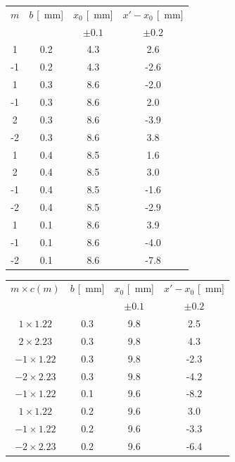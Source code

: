\documentclass[10pt,oneside,a4paper]{article}
\begin{document}
\begin{minipage}[t]{.5\linewidth}
\vspace{0cm}
\begin{center}
\label{tab:misuraLambda1}
\begin{tabular}{c|c|c|c}
$m$ & $b$ [\SI{}{mm}] & $x_0$ [\SI{}{mm}] & $x'-x_0$ [\SI{}{mm}]\\
 & & $\pm 0.1$ & $\pm 0.2$\\
\hline
  1 & 0.2 & 4.3 &  2.6 \\
 -1 & 0.2 & 4.3 & -2.6 \\
  1 & 0.3 & 8.6 & -2.0 \\
 -1 & 0.3 & 8.6 &  2.0 \\
  2 & 0.3 & 8.6 & -3.9 \\
 -2 & 0.3 & 8.6 &  3.8 \\
  1 & 0.4 & 8.5 &  1.6 \\
  2 & 0.4 & 8.5 &  3.0 \\
 -1 & 0.4 & 8.5 & -1.6 \\
 -2 & 0.4 & 8.5 & -2.9 \\
  1 & 0.1 & 8.6 &  3.9 \\
 -1 & 0.1 & 8.6 & -4.0 \\
 -2 & 0.1 & 8.6 & -7.8 \\
\hline
\end{tabular}
\end{center}
\end{minipage}
\quad
\begin{minipage}[t]{.5\linewidth}
\vspace{0cm}
\begin{center}
\label{tab:misuraLambda2}
\begin{tabular}{c|c|c|c}
$m \times c(m)$ & $b$ [\SI{}{mm}] & $x_0$ [\SI{}{mm}] & $x'-x_0$ [\SI{}{mm}]\\
 & & $\pm 0.1$ & $\pm 0.2$\\
\hline
  $1 \times 1.22$ & 0.3 & 9.8 &  2.5 \\
  $2 \times 2.23$ & 0.3 & 9.8 &  4.3 \\
 $-1 \times 1.22$ & 0.3 & 9.8 & -2.3 \\
 $-2 \times 2.23$ & 0.3 & 9.8 & -4.2 \\
 $-1 \times 1.22$ & 0.1 & 9.6 & -8.2 \\
 $1 \times 1.22$ & 0.2 & 9.6 &  3.0 \\
 $-1 \times 1.22$ & 0.2 & 9.6 & -3.3 \\
 $-2 \times 2.23$ & 0.2 & 9.6 & -6.4 \\
\hline
\end{tabular}
\end{center}
\end{minipage}
\end{document}
